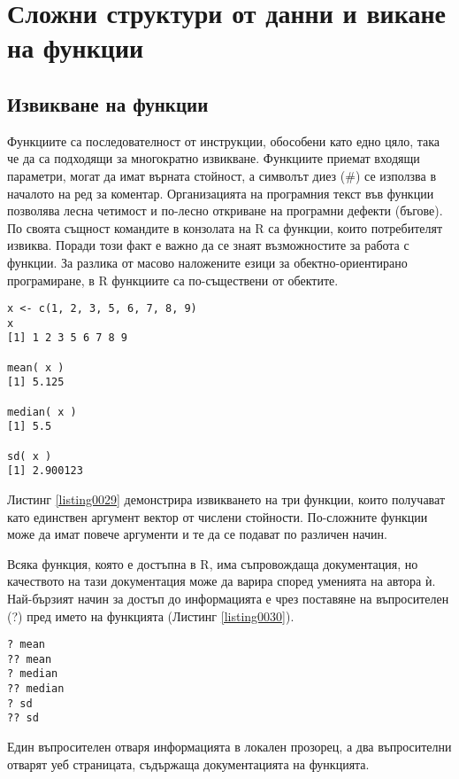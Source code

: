 \newpage
\chapter{Сложни структури от данни и викане на функции}
\label{chapter03}

\section{Извикване на функции}

Функциите са последователност от инструкции, обособени като едно цяло, така че да са подходящи за многократно извикване. Функциите приемат входящи параметри, могат да имат върната стойност, а символът диез (\#) се използва в началото на ред за коментар. Организацията на програмния текст във функции позволява лесна четимост и по-лесно откриване на програмни дефекти (бъгове). По своята същност командите в конзолата на R са функции, които потребителят извиква. Поради този факт е важно да се знаят възможностите за работа с функции. За разлика от масово наложените езици за обектно-ориентирано програмиране, в R функциите са по-съществени от обектите.

\begin{lstlisting}[caption=Извикване на функции, label=listing0029]
x <- c(1, 2, 3, 5, 6, 7, 8, 9)
x
[1] 1 2 3 5 6 7 8 9

mean( x )
[1] 5.125

median( x )
[1] 5.5

sd( x )
[1] 2.900123
\end{lstlisting}

Листинг \ref{listing0029} демонстрира извикването на три функции, които получават като единствен аргумент вектор от числени стойности. По-сложните функции може да имат повече аргументи и те да се подават по различен начин.

Всяка функция, която е достъпна в R, има съпровождаща документация, но качеството на тази документация може да варира според уменията на автора ѝ. Най-бързият начин за достъп до информацията е чрез поставяне на въпросителен (?) пред името на функцията (Листинг \ref{listing0030}).

\begin{lstlisting}[caption=Документация за функциите, label=listing0030]
? mean
?? mean
? median
?? median
? sd
?? sd
\end{lstlisting}

Един въпросителен отваря информацията в локален прозорец, а два въпросителни отварят уеб страницата, съдържаща документацията на функцията.

